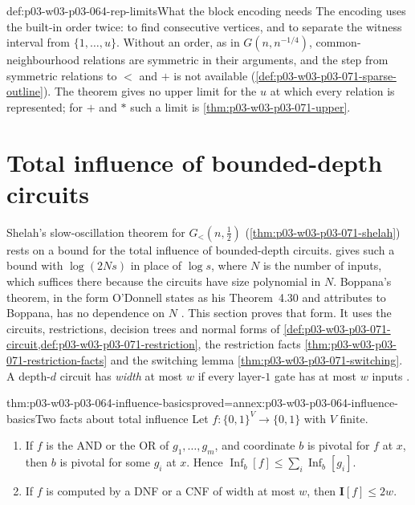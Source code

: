 \begin{hbwarning}{def:p03-w03-p03-064-rep-limits}{What the block encoding needs}
The encoding uses the built-in order twice: to find consecutive vertices,
and to separate the witness interval from \(\{1,\ldots,u\}\).  Without an
order, as in \(G(n,n^{-1/4})\), common-neighbourhood relations are symmetric
in their arguments, and the step from symmetric relations to \(<\) and \(+\)
is not available (\cref{def:p03-w03-p03-071-sparse-outline}).  The theorem
gives no upper limit for the \(u\) at which every relation is represented;
for \(+\) and \(\ast\) such a limit is \cref{thm:p03-w03-p03-071-upper}.
\end{hbwarning}

\section{Total influence of bounded-depth circuits}
\label{sec:p03-w03-p03-064-circuits}

Shelah's slow-oscillation theorem for \(G_<(n,\frac12)\)
(\cref{thm:p03-w03-p03-071-shelah}) rests on a bound for the total influence
of bounded-depth circuits.   gives
such a bound with \(\log(2Ns)\) in place of \(\log s\), where \(N\) is the
number of inputs, which suffices there because the circuits have size
polynomial in \(N\).  Boppana's theorem, in the form O'Donnell states as his
Theorem~4.30 and attributes to Boppana, has no dependence on \(N\)
\cite[thm.~4.30, p.~106; p.~111]{ODonnell2021AnalysisBooleanArxiv}.  This
section proves that form.  It uses the circuits, restrictions, decision
trees and normal forms of
\cref{def:p03-w03-p03-071-circuit,def:p03-w03-p03-071-restriction}, the
restriction facts \cref{thm:p03-w03-p03-071-restriction-facts} and the
switching lemma \cref{thm:p03-w03-p03-071-switching}.  A depth-\(d\) circuit
has \emph{width} at most \(w\) if every layer-\(1\) gate has at most \(w\)
inputs \cite[def.~4.27, p.~104]{ODonnell2021AnalysisBooleanArxiv}.

\begin{hblemma}{thm:p03-w03-p03-064-influence-basics}{proved=annex:p03-w03-p03-064-influence-basics}{Two facts about total influence}
Let \(f:\{0,1\}^V\to\{0,1\}\) with \(V\) finite.
\begin{enumerate}
\item If \(f\) is the AND or the OR of \(g_1,\ldots,g_m\), and coordinate
  \(b\) is pivotal for \(f\) at \(x\), then \(b\) is pivotal for some \(g_i\)
  at \(x\).  Hence
  \(\operatorname{Inf}_b[f]\leq\sum_i\operatorname{Inf}_b[g_i]\).
\item If \(f\) is computed by a DNF or a CNF of width at most \(w\), then
  \(\mathbf I[f]\leq2w\).
\end{enumerate}
\end{hblemma}


